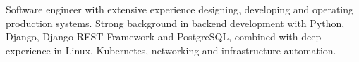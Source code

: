 Software engineer with extensive experience designing, developing and operating production systems. Strong background
in backend development with Python, Django, Django REST Framework and PostgreSQL, combined with deep experience in Linux,
Kubernetes, networking and infrastructure automation.
